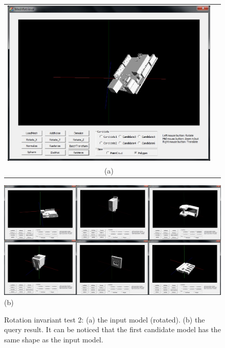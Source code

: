\begin{figure}
\begin{center}
\begin{tabular}{cc}   %
   \includegraphics[width=0.6\linewidth]{input_rotationinvariant_test32}  \\
   (a) \\
\end{tabular}
   \includegraphics[width=1\linewidth]{output_rotationinvariant_test32}  \\
   (b)  \\
\caption{Rotation invariant test 2: (a) the input model (rotated). (b) the query result. It can be noticed that the first candidate model has the same shape as the input model.} 
  \label{noiseinvarianttest_UI2}
\end{center}
\end{figure}

